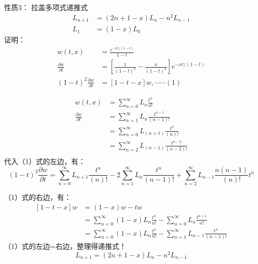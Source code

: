 \begin{frame}
	\alert{	性质3：}  拉盖多项式递推式
	\begin{equation*}
	\begin{split}
		L_{n+1} &= (2n+1-x) L_n  -n^2 L_{n-1}  \\
		L_1 &=(1-x) L_0 
	\end{split}		
	\end{equation*}	
	\alert{	证明：}   
	\begin{equation*}
	\begin{split}
		w(t,x) &=\frac{e^{-xt/(1-t) } } {1-t}\\
		\frac{\partial w}{\partial t}  &= [\frac{1}{(1-t)^2} -\frac{x}{(1-t)^3}]  e^{-xt/(1-t) }     \\
		(1-t)^2	\frac{\partial w}{\partial t}  &= [1 -t-x] w   , \cdots \cdots  (1)
	\end{split}		
	\end{equation*}	
\end{frame}		

\begin{frame}
	\begin{equation*}
	\begin{split}
		w(t,x) &= \sum_{n=0}^{\infty}  L_n  \frac{t^n}{n!} \\
		\frac{\partial w}{\partial t}  &=   \sum_{n=1}^{\infty}  L_n  \frac{t^{n-1}}{(n-1)!}   \\
		&=  \sum_{n=0}^{\infty}  L_{(n+1)}  \frac{t^n}{(n)!} \\
		&=  \sum_{n=2}^{\infty}  L_{(n-1)}  \frac{t^{n-2}}{(n-2)!} \\
	\end{split}		
	\end{equation*}	
	代入（1）式的左边，有：
	\begin{equation*}
		(1-t)^2	\frac{\partial w}{\partial t}  =   \sum_{n=0}^{\infty}  L_{n+1}  \frac{t^n}{(n)!}  -2  \sum_{n=1}^{\infty}  L_{n}  \frac{t^n}{(n-1)!} +  \sum_{n=2}^{\infty}  L_{n-1}  \frac{n(n-1)}{(n)!}  t^n
	\end{equation*}	
\end{frame}		

\begin{frame}
	（1）式的右边，有：
	\begin{equation*}
		\begin{split}
			[1 -t-x] w &= (1-x)w -t w \\
			& =   \sum_{n=0}^{\infty} (1-x) L_n  \frac{t^n}{n!} -  \sum_{n=0}^{\infty}  L_n  \frac{t^{n+1}}{n!} \\
			&=  \sum_{n=0}^{\infty} (1-x) L_n  \frac{t^n}{n!} -  \sum_{n=1}^{\infty}  L_{n-1}  \frac{t^n}{(n-1)!}
		\end{split}		
	\end{equation*}	
	（1）式的左边=右边，整理得递推式！
	\begin{equation*}
			L_{n+1} = (2n+1-x) L_n  -n^2 L_{n-1}  
	\end{equation*}	
\end{frame}		


